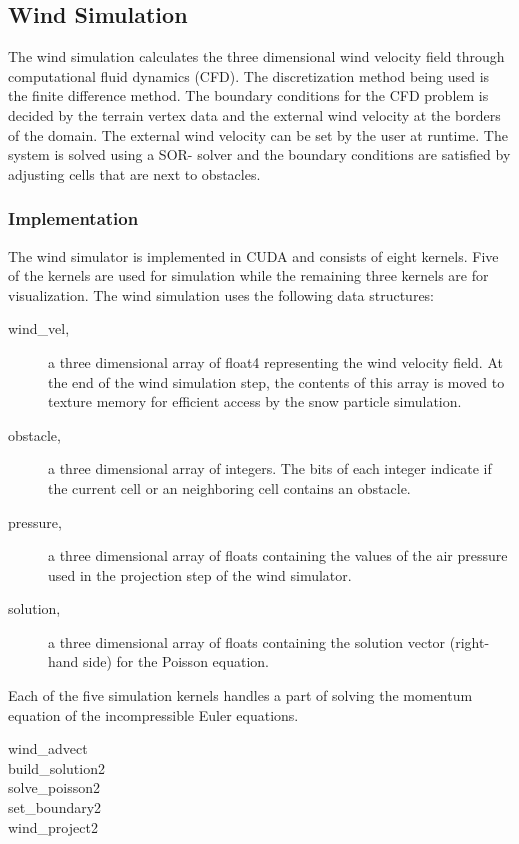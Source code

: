 \subsection{Wind Simulation}

The wind simulation calculates the three dimensional wind velocity field through
computational fluid dynamics (CFD). The discretization method being used is the
finite difference method. The boundary conditions for the CFD problem is decided
by the terrain vertex data and the external wind velocity at the borders of the
domain. The external wind velocity can be set by the user at runtime. The system
is solved using a SOR- solver and the boundary conditions are satisfied by
adjusting cells that are next to obstacles.

\subsubsection{Implementation}

The wind simulator is implemented in CUDA and consists of eight kernels. Five of 
the kernels are used for simulation while the remaining three kernels are for 
visualization. The wind simulation uses the following data structures:

\begin{description}
	\item[wind\_vel,] a three dimensional array of float4 representing the wind 
	velocity field. At the end of the wind simulation step, the contents of this 
	array is moved to texture memory for efficient access by the snow particle 
	simulation. 
	\item[obstacle,] a three dimensional array of integers. The bits of each 
	integer indicate if the current cell or an neighboring cell contains an 
	obstacle. 
	\item[pressure,] a three dimensional array of floats containing the values 
	of the air pressure used in the projection step of the wind simulator. 
	\item[solution,] a three dimensional array of floats containing the solution 
	vector (right-hand side) for the Poisson equation. 
\end{description}

Each of the five simulation kernels handles a part of solving the momentum equation 
of the incompressible Euler equations.
\begin{description}
	\item[wind\_advect]
	\item[build\_solution2]
	\item[solve\_poisson2]
	\item[set\_boundary2]
	\item[wind\_project2]
\end{description}


